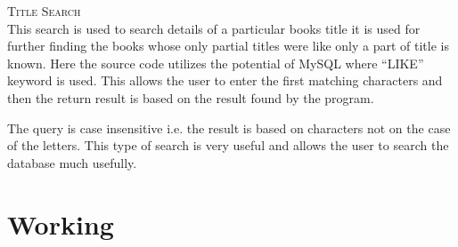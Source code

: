 \documentclass[12pt, a4paper, titlepage, openany]{report}
\begin{document}
\textsc{Title Search}\\
This search is used to search details of a particular books title it is used for further finding the books whose only partial titles were like only a part of title is known. Here the source code utilizes the potential of MySQL where ``LIKE'' keyword is used. This allows the user to enter the first matching characters and then the return result is based on the result found by the program. 

The query is case insensitive i.e. the result is based on characters not on the case of the letters. This type of search is very useful and allows the user to search the database much usefully.


\newpage

\section{Working}
\end{document}
